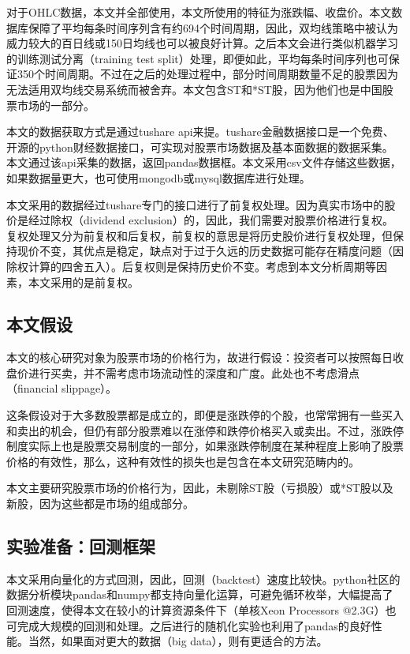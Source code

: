 \documentclass[twoside,longtitle]{LZUthesis}
\begin{document}
对于OHLC数据，本文并全部使用，本文所使用的特征为涨跌幅、收盘价。本文数据库保障了平均每条时间序列含有约694个时间周期，因此，双均线策略中被认为威力较大的百日线或150日均线也可以被良好计算。之后本文会进行类似机器学习的训练测试分离（training test split）处理，即便如此，平均每条时间序列也可保证350个时间周期。不过在之后的处理过程中，部分时间周期数量不足的股票因为无法适用双均线交易系统而被舍弃。本文包含ST和*ST股，因为他们也是中国股票市场的一部分。

本文的数据获取方式是通过tushare api来提。tushare金融数据接口是一个免费、开源的python财经数据接口，可实现对股票市场数据及基本面数据的数据采集。本文通过该api采集的数据，返回pandas数据框\cite{mckinney2012python}。本文采用csv文件存储这些数据，如果数据量更大，也可使用mongodb或mysql数据库进行处理。

本文采用的数据经过tushare专门的接口进行了前复权处理。因为真实市场中的股价是经过除权（dividend exclusion）的，因此，我们需要对股票价格进行复权。复权处理又分为前复权和后复权，前复权的意思是将历史股价进行复权处理，但保持现价不变，其优点是稳定，缺点对于过于久远的历史数据可能存在精度问题（因除权计算的四舍五入）。后复权则是保持历史价不变。考虑到本文分析周期等因素，本文采用的是前复权。


\subsection{本文假设}



本文的核心研究对象为股票市场的价格行为，故进行假设：投资者可以按照每日收盘价进行买卖，并不需考虑市场流动性的深度和广度。此处也不考虑滑点（financial slippage）。

这条假设对于大多数股票都是成立的，即便是涨跌停的个股，也常常拥有一些买入和卖出的机会，但仍有部分股票难以在涨停和跌停价格买入或卖出。不过，涨跌停制度实际上也是股票交易制度的一部分，如果涨跌停制度在某种程度上影响了股票价格的有效性，那么，这种有效性的损失也是包含在本文研究范畴内的。

本文主要研究股票市场的价格行为，因此，未剔除ST股（亏损股）或*ST股以及新股，因为这些都是市场的组成部分。

\subsection{实验准备：回测框架}
本文采用向量化的方式回测，因此，回测（backtest）速度比较快。python社区的数据分析模块pandas\cite{hilpisch2014python}和numpy都支持向量化运算，可避免循环枚举，大幅提高了回测速度，使得本文在较小的计算资源条件下（单核Xeon Processors @2.3G）也可完成大规模的回测和处理。之后进行的随机化实验也利用了pandas的良好性能。当然，如果面对更大的数据（big data），则有更适合的方法。
\end{document}
